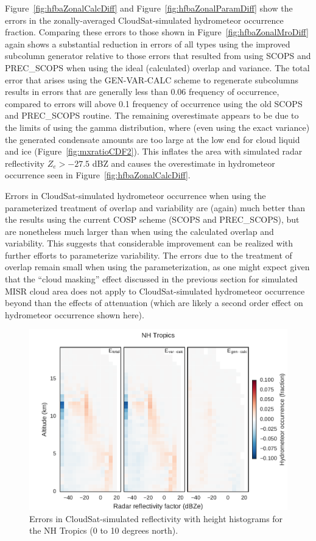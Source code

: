 Figure~\ref{fig:hfbaZonalCalcDiff} and
Figure~\ref{fig:hfbaZonalParamDiff} show the errors in the
zonally-averaged CloudSat-simulated hydrometeor occurrence fraction.
Comparing these errors to those shown in
Figure~\ref{fig:hfbaZonalMroDiff} again shows a substantial reduction in
errors of all types using the improved subcolumn generator relative to
those errors that resulted from using SCOPS and PREC\_SCOPS when using
the ideal (calculated) overlap and variance. The total error that arises
using the GEN-VAR-CALC scheme to regenerate subcolumns results in errors
that are generally less than 0.06 frequency of occurrence, compared to
errors will above 0.1 frequency of occurrence using the old SCOPS and
PREC\_SCOPS routine. The remaining overestimate appears to be due to the
limits of using the gamma distribution, where (even using the exact
variance) the generated condensate amounts are too large at the low end
for cloud liquid and ice (Figure~\ref{fig:mxratioCDF2}). This inflates
the area with simulated radar reflectivity \(Z_e > -27.5\) dBZ and
causes the overestimate in hydrometeor occurrence seen in
Figure~\ref{fig:hfbaZonalCalcDiff}.

Errors in CloudSat-simulated hydrometeor occurrence when using the
parameterized treatment of overlap and variability are (again) much
better than the results using the current COSP scheme (SCOPS and
PREC\_SCOPS), but are nonetheless much larger than when using the
calculated overlap and variability. This suggests that considerable
improvement can be realized with further efforts to parameterize
variability. The errors due to the treatment of overlap remain small
when using the parameterization, as one might expect given that the
``cloud masking'' effect discussed in the previous section for simulated
MISR cloud area does not apply to CloudSat-simulated hydrometeor
occurrence beyond than the effects of attenuation (which are likely a
second order effect on hydrometeor occurrence shown here).

\begin{figure}[htbp]
\centering
\includegraphics{graphics/subgrid2_cfadDbze94_NHTropics_gen-var-calc_diff.pdf}
\caption{\label{fig:cfadTropicsCalcDiff}Errors in CloudSat-simulated
reflectivity with height histograms for the NH Tropics (0 to 10 degrees
north).}\label{fig:cfadTropicsCalcDiff}
\end{figure}

